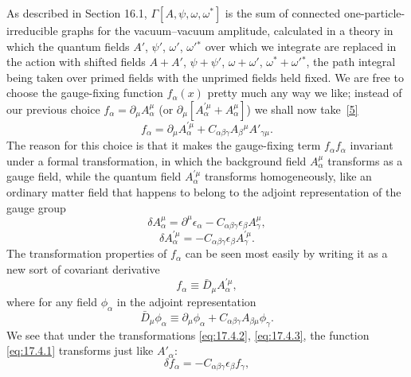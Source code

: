 As described in Section 16.1, $\Gamma[A,\psi,\omega,\omega^*]$ is the sum of
connected one-particle-irreducible graphs for the vacuum--vacuum amplitude,
calculated in a theory in which the quantum fields
$A'$, $\psi'$, $\omega'$, $\omega'{}^*$ over which we integrate are replaced
in the action with shifted fields $A+A'$, $\psi+\psi'$, $\omega+\omega'$,
$\omega^*+\omega'{}^*$, the path integral being taken over primed fields
with the unprimed fields held fixed. We are free to choose the gauge-fixing
function $f_\alpha(x)$ pretty much any way we like; instead of our previous
choice $f_\alpha=\partial_\mu A_\alpha^\mu$ (or
$\partial_\mu[A_\alpha^{\prime\mu}+A_\alpha^\mu]$) we shall now
take~\hyperref[ch17-ref-5]{[5]}
\begin{equation}
f_\alpha=\partial_\mu A_\alpha^{\prime\mu}
+C_{\alpha\beta\gamma}A_\beta{}^\mu A'_{\gamma\mu}.
\label{eq:17.4.1}
\end{equation}
The reason for this choice is that it makes the gauge-fixing term
$f_\alpha f_\alpha$ invariant under a formal transformation, in which the
background field $A_\alpha^\mu$ transforms as a gauge field, while the
quantum field $A_\alpha^{\prime\mu}$ transforms homogeneously, like an
ordinary matter field that happens to belong to the adjoint representation
of the gauge group
\begin{equation}
\delta A_\alpha^\mu=\partial^\mu\epsilon_\alpha
-C_{\alpha\beta\gamma}\epsilon_\beta A_\gamma^\mu,
\label{eq:17.4.2}
\end{equation}
\begin{equation}
\delta A_\alpha^{\prime\mu}
=-C_{\alpha\beta\gamma}\epsilon_\beta A_\gamma^{\prime\mu}.
\label{eq:17.4.3}
\end{equation}
The transformation properties of $f_\alpha$ can be seen most easily by
writing it as a new sort of covariant derivative
\begin{equation}
f_\alpha\equiv\bar D_\mu A_\alpha^{\prime\mu},
\label{eq:17.4.4}
\end{equation}
where for any field $\phi_\alpha$ in the adjoint representation
\begin{equation}
\bar D_\mu\phi_\alpha\equiv
\partial_\mu\phi_\alpha+C_{\alpha\beta\gamma}A_{\beta\mu}\phi_\gamma.
\label{eq:17.4.5}
\end{equation}
We see that under the transformations \eqref{eq:17.4.2},
\eqref{eq:17.4.3}, the function \eqref{eq:17.4.1} transforms just like
$A'_\alpha$:
\begin{equation}
\delta f_\alpha=-C_{\alpha\beta\gamma}\epsilon_\beta f_\gamma,
\label{eq:17.4.6}
\end{equation}
